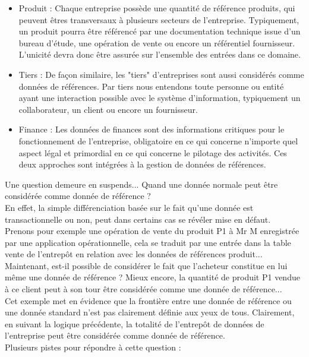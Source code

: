 \begin{itemize}
\item Produit : Chaque entreprise possède une quantité de référence produits, qui peuvent êtres transversaux à plusieurs secteurs de l'entreprise. Typiquement, un produit pourra être référencé par une documentation technique issue d'un bureau d'étude, une opération de vente  ou encore un référentiel fournisseur. L'unicité devra donc être assurée sur l'ensemble des entrées dans ce domaine.
\item Tiers : De façon similaire, les "tiers" d'entreprises sont aussi considérés comme données de références. Par tiers nous entendons toute personne ou entité ayant une interaction possible avec le système d'information, typiquement un collaborateur, un client ou encore un fournisseur.
\item Finance  : Les données de finances sont des informations critiques pour le fonctionnement de l'entreprise, obligatoire en ce qui concerne n'importe quel aspect légal et primordial en ce qui concerne le pilotage des activités. Ces deux approches sont intégrées à la gestion de données de références.
\end{itemize}

Une question demeure en suspends... Quand une donnée normale peut être considérée comme donnée de référence ?\\
En effet, la simple différenciation basée sur le fait qu'une donnée est transactionnelle ou non, peut dans certains cas se révéler mise en défaut.\\
Prenons pour exemple une opération de vente du produit P1 à Mr M enregistrée par une application opérationnelle, cela se traduit par une entrée dans la table vente de l'entrepôt en relation avec les données de références produit...\\
Maintenant, est-il possible de considérer le fait que l'acheteur constitue en lui même une donnée de référence ? Mieux encore, la quantité de produit P1 vendue à ce client peut à son tour être considérée comme une donnée de référence...\\
Cet exemple met en évidence que la frontière entre une donnée de référence ou une donnée standard n'est pas clairement définie aux yeux de tous. Clairement, en suivant la logique précédente, la totalité de l'entrepôt de données de l'entreprise peut être considérée comme donnée de référence.\\
Plusieurs pistes pour répondre à cette question : \\

